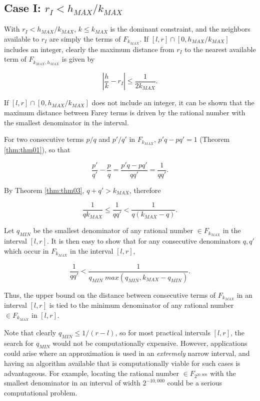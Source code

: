 \documentclass{esub2acm}
\begin{document}
\subsection{Case I:  $r_I < h_{MAX}/k_{MAX}$}
\label{subsec:casei}

With $r_I < h_{MAX}/k_{MAX}$, $k \leq k_{MAX}$ is the dominant
constraint, and the neighbors available to $r_I$ are simply the
terms of $F_{k_{MAX}}$.  If $[l, r] \cap  [0, h_{MAX}/k_{MAX}]$
includes an integer, clearly the maximum distance from $r_I$ to the
nearest available term of $F_{k_{MAX}, \overline{h_{MAX}}}$ is given
by

\begin{equation}
\left|
\frac{h}{k} - r_I
\right|
\leq
\frac{1}{2 k_{MAX}}.
\end{equation}

If $[l, r] \cap  [0, h_{MAX}/k_{MAX}]$ does
not include an integer, it can be shown that the
maximum distance between Farey terms is driven by the
rational number with the smallest denominator in the
interval.

For two consecutive terms $p/q$ and $p'/q'$ in $F_{k_{MAX}}$,
$p'q - pq' = 1$ (Theorem \ref{thm:thm01}), so that

\begin{equation}
\frac{p'}{q'} - \frac{p}{q} =
\frac{p'q - pq'}{q q'} = \frac{1}{qq'} .
\end{equation}

By Theorem \ref{thm:thm03}, $q+q' > k_{MAX}$, therefore

\begin{equation}
\label{eq:minqplacementupperbound}
\frac{1}{q k_{MAX}} \leq
\frac{1}{q q'} <
\frac{1}{q (k_{MAX}-q)}.
\end{equation}

Let $q_{MIN}$ be the smallest denominator of any rational number
$\in F_{k_{MAX}}$ in the interval $[l,r]$.  It is then easy to show
that for any consecutive denominators $q, q'$ which occur in
$F_{k_{MAX}}$ in the interval $[l,r]$,

\begin{equation}
\frac{1}{q q'} < \frac{1}{q_{MIN} \; max (q_{MIN}, k_{MAX} - q_{MIN})} .
\end{equation}

Thus, the upper bound on the distance between consecutive terms of $F_{k_{MAX}}$
in an interval $[l,r]$ is tied to the minimum denominator of any
rational number $\in F_{k_{MAX}}$ in $[l,r]$.

Note that clearly
$q_{MIN} \leq 1/(r-l)$, so for most practical intervals $[l,r]$,
the search for $q_{MIN}$ would not be computationally expensive.
However, applications could arise where an approximation is used
in an \emph{extremely} narrow interval, and having an algorithm available that
is computationally viable for such cases is advantageous.  For example,
locating the rational number $\in F_{2^{20,000}}$ with the smallest denominator
in an interval of width $2^{-10,000}$ could be a serious computational
problem.
\end{document}
